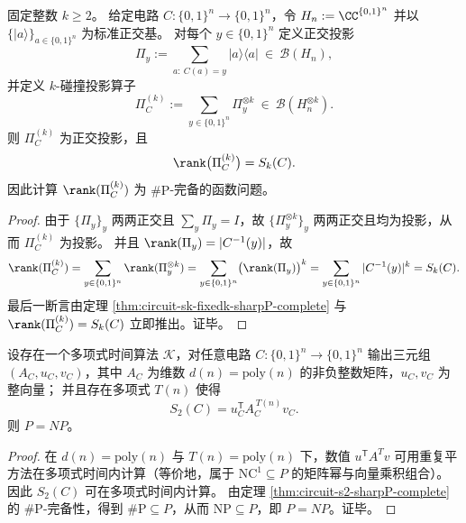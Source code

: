 \begin{corollary}\label{cor:circuit-k-collision-projector-rank-sharpP-complete}
固定整数 \(k\ge 2\)。
给定电路 \(C:\{0,1\}^n\to\{0,1\}^n\)，令 \(H_n:=\CC^{\{0,1\}^n}\) 并以 \(\{\lvert a\rangle\}_{a\in\{0,1\}^n}\) 为标准正交基。
对每个 \(y\in\{0,1\}^n\) 定义正交投影
\[
\Pi_y:=\sum_{a:\ C(a)=y}\lvert a\rangle\langle a\rvert\ \in\ \mathcal{B}(H_n),
\]
并定义 \(k\)-碰撞投影算子
\[
\Pi_C^{(k)}:=\sum_{y\in\{0,1\}^n}\Pi_y^{\otimes k}\ \in\ \mathcal{B}(H_n^{\otimes k}).
\]
则 \(\Pi_C^{(k)}\) 为正交投影，且
\[
\rank\bigl(\Pi_C^{(k)}\bigr)=S_k(C).
\]
因此计算 \(\rank(\Pi_C^{(k)})\) 为 \(\#\mathrm{P}\)-完备的函数问题。
\end{corollary}
\begin{proof}
由于 \(\{\Pi_y\}_{y}\) 两两正交且 \(\sum_y\Pi_y=I\)，故 \(\{\Pi_y^{\otimes k}\}_{y}\) 两两正交且均为投影，从而 \(\Pi_C^{(k)}\) 为投影。
并且 \(\rank(\Pi_y)=|C^{-1}(y)|\)，故
\[
\rank(\Pi_C^{(k)})
=\sum_{y\in\{0,1\}^n}\rank(\Pi_y^{\otimes k})
=\sum_{y\in\{0,1\}^n}\bigl(\rank(\Pi_y)\bigr)^k
=\sum_{y\in\{0,1\}^n}|C^{-1}(y)|^k
=S_k(C).
\]
最后一断言由定理 \ref{thm:circuit-sk-fixedk-sharpP-complete} 与 \(\rank(\Pi_C^{(k)})=S_k(C)\) 立即推出。证毕。
\end{proof}

\begin{proposition}[通用可编译碰撞核将强迫 \texorpdfstring{$P=NP$}{P=NP}]\label{prop:universal-compilable-collision-kernel-implies-p-np}
设存在一个多项式时间算法 \(\mathcal K\)，对任意电路 \(C:\{0,1\}^n\to\{0,1\}^n\) 输出三元组 \((A_C,u_C,v_C)\)，其中 \(A_C\) 为维数 \(d(n)=\mathrm{poly}(n)\) 的非负整数矩阵，\(u_C,v_C\) 为整向量；
并且存在多项式 \(T(n)\) 使得
\[
S_2(C)=u_C^{\mathsf T}A_C^{\,T(n)}v_C.
\]
则 \(P=NP\)。
\end{proposition}

\begin{proof}
在 \(d(n)=\mathrm{poly}(n)\) 与 \(T(n)=\mathrm{poly}(n)\) 下，数值 \(u^{\mathsf T}A^{T}v\) 可用重复平方法在多项式时间内计算（等价地，属于 \(\mathrm{NC}^1\subseteq P\) 的矩阵幂与向量乘积组合）。
因此 \(S_2(C)\) 可在多项式时间内计算。
由定理 \ref{thm:circuit-s2-sharpP-complete} 的 \(\#\mathrm{P}\)-完备性，得到 \(\#\mathrm{P}\subseteq P\)，从而 \(\mathrm{NP}\subseteq P\)，即 \(P=NP\)。证毕。
\end{proof}

